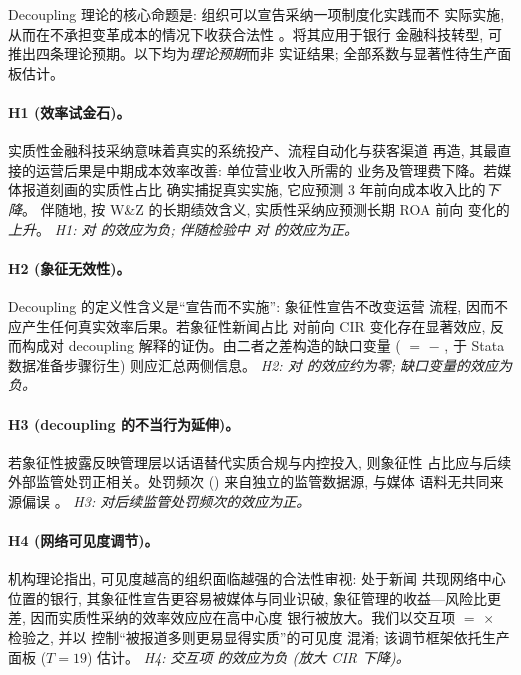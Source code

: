 Decoupling 理论的核心命题是: 组织可以宣告采纳一项制度化实践而不
实际实施, 从而在不承担变革成本的情况下收获合法性
\parencite{westphal1998sym,westphal2001decoupling}。将其应用于银行
金融科技转型, 可推出四条理论预期。以下均为\emph{理论预期}而非
实证结果; 全部系数与显著性待生产面板估计。

\paragraph{H1 (效率试金石)。}
实质性金融科技采纳意味着真实的系统投产、流程自动化与获客渠道
再造, 其最直接的运营后果是中期成本效率改善: 单位营业收入所需的
业务及管理费下降。若媒体报道刻画的实质性占比 
确实捕捉真实实施, 它应预测 3 年前向成本收入比的\emph{下降}。
伴随地, 按 W\&Z 的长期绩效含义, 实质性采纳应预测长期 ROA 前向
变化的\emph{上升}。
\emph{H1:  对 
的效应为负; 伴随检验中  对
 的效应为正。}

\paragraph{H2 (象征无效性)。}
Decoupling 的定义性含义是``宣告而不实施'': 象征性宣告不改变运营
流程, 因而不应产生任何真实效率后果。若象征性新闻占比
 对前向 CIR 变化存在显著效应, 反而构成对
decoupling 解释的证伪。由二者之差构造的缺口变量
( $=$  $-$
, 于 Stata 数据准备步骤衍生) 则应汇总两侧信息。
\emph{H2:  对 
的效应约为零; 缺口变量的效应为负。}

\paragraph{H3 (decoupling 的不当行为延伸)。}
若象征性披露反映管理层以话语替代实质合规与内控投入, 则象征性
占比应与后续外部监管处罚正相关。处罚频次
() 来自独立的监管数据源, 与媒体
语料无共同来源偏误 \parencite{heese2022newspaper}。
\emph{H3:  对后续监管处罚频次的效应为正。}

\paragraph{H4 (网络可见度调节)。}
机构理论指出, 可见度越高的组织面临越强的合法性审视: 处于新闻
共现网络中心位置的银行, 其象征性宣告更容易被媒体与同业识破,
象征管理的收益—风险比更差, 因而实质性采纳的效率效应应在高中心度
银行被放大。我们以交互项  $=$ 
$\times$  检验之, 并以
 控制``被报道多则更易显得实质''的可见度
混淆; 该调节框架依托生产面板 ($T=19$) 估计。
\emph{H4: 交互项  的效应为负 (放大 CIR 下降)。}

